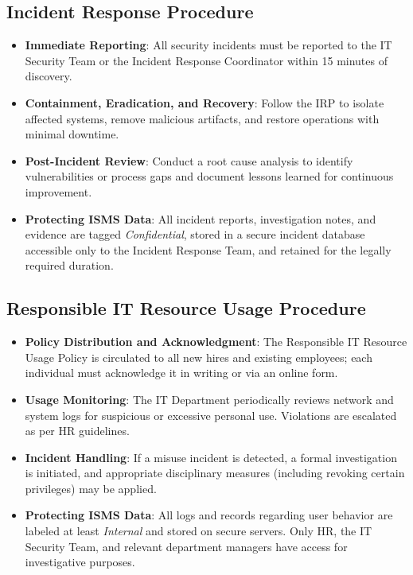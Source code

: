 \subsection{Incident Response Procedure}
\begin{itemize}
    \item \textbf{Immediate Reporting}: 
    All security incidents must be reported to the \ac{IT} Security Team 
    or the Incident Response Coordinator within 15 minutes of discovery.
    \item \textbf{Containment, Eradication, and Recovery}: 
    Follow the \ac{IRP} to isolate affected systems, 
    remove malicious artifacts, and restore operations with minimal 
    downtime.
    \item \textbf{Post-Incident Review}: 
    Conduct a root cause analysis to identify vulnerabilities 
    or process gaps and document lessons learned for continuous 
    improvement.
    \item \textbf{Protecting \ac{ISMS} Data}:
    All incident reports, investigation notes, and evidence are 
    tagged \textit{Confidential}, stored in a secure incident 
    database accessible only to the Incident Response Team, 
    and retained for the legally required duration.
\end{itemize}

\subsection{Responsible \ac{IT} Resource Usage Procedure}
\begin{itemize}
    \item \textbf{Policy Distribution and Acknowledgment}:
    The Responsible \ac{IT} Resource Usage Policy is circulated 
    to all new hires and existing employees; each individual 
    must acknowledge it in writing or via an online form.
    \item \textbf{Usage Monitoring}:
    The \ac{IT} Department periodically reviews network and 
    system logs for suspicious or excessive personal use. 
    Violations are escalated as per HR guidelines.
    \item \textbf{Incident Handling}:
    If a misuse incident is detected, a formal investigation 
    is initiated, and appropriate disciplinary measures 
    (including revoking certain privileges) may be applied.
    \item \textbf{Protecting \ac{ISMS} Data}:
    All logs and records regarding user behavior are labeled 
    at least \textit{Internal} and stored on secure servers. 
    Only HR, the \ac{IT} Security Team, and relevant department 
    managers have access for investigative purposes.
\end{itemize}
